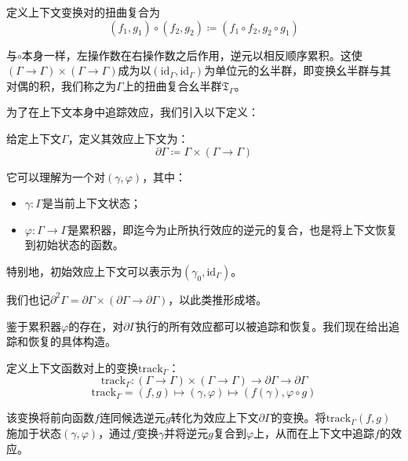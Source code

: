 \begin{definition}\label{def:3.1}
定义上下文变换对的扭曲复合为
\begin{equation}\label{eq:3.4}
(f_1, g_1) \circ (f_2, g_2) \coloneqq (f_1 \circ f_2, g_2 \circ g_1)
\end{equation}
\end{definition}

与$\circ$本身一样，左操作数在右操作数之后作用，逆元以相反顺序累积。这使$(\Gamma \to \Gamma) \times (\Gamma \to \Gamma)$成为以$(\mathrm{id}_\Gamma, \mathrm{id}_\Gamma)$为单位元的幺半群，即变换幺半群与其对偶的积，我们称之为$\Gamma$上的扭曲复合幺半群$\mathfrak{T}_\Gamma$。

为了在上下文本身中追踪效应，我们引入以下定义：

\begin{definition}\label{def:3.2}
给定上下文$\Gamma$，定义其效应上下文为：
\begin{equation}\label{eq:3.5}
\partial\Gamma \coloneqq \Gamma \times (\Gamma \to \Gamma)
\end{equation}
\end{definition}

它可以理解为一个对$(\gamma, \varphi)$，其中：
\begin{itemize}
\item $\gamma: \Gamma$是当前上下文状态；
\item $\varphi: \Gamma \to \Gamma$是累积器，即迄今为止所执行效应的逆元的复合，也是将上下文恢复到初始状态的函数。
\end{itemize}

特别地，初始效应上下文可以表示为$(\gamma_0, \mathrm{id}_\Gamma)$。

我们也记$\partial^2\Gamma = \partial\Gamma \times (\partial\Gamma \to \partial\Gamma)$，以此类推形成塔。

鉴于累积器$\varphi$的存在，对$\partial\Gamma$执行的所有效应都可以被追踪和恢复。我们现在给出追踪和恢复的具体构造。

\begin{definition}\label{def:3.3}
定义上下文函数对上的变换$\mathrm{track}_\Gamma$：
\begin{equation}\label{eq:3.6}
\mathrm{track}_\Gamma : (\Gamma \to \Gamma) \times (\Gamma \to \Gamma) \to \partial\Gamma \to \partial\Gamma
\end{equation}
\[
\mathrm{track}_\Gamma = (f, g) \mapsto (\gamma, \varphi) \mapsto (f(\gamma), \varphi \circ g)
\]
\end{definition}

该变换将前向函数$f$连同候选逆元$g$转化为效应上下文$\partial\Gamma$的变换。将$\mathrm{track}_\Gamma(f, g)$施加于状态$(\gamma, \varphi)$，通过$f$变换$\gamma$并将逆元$g$复合到$\varphi$上，从而在上下文中追踪$f$的效应。

